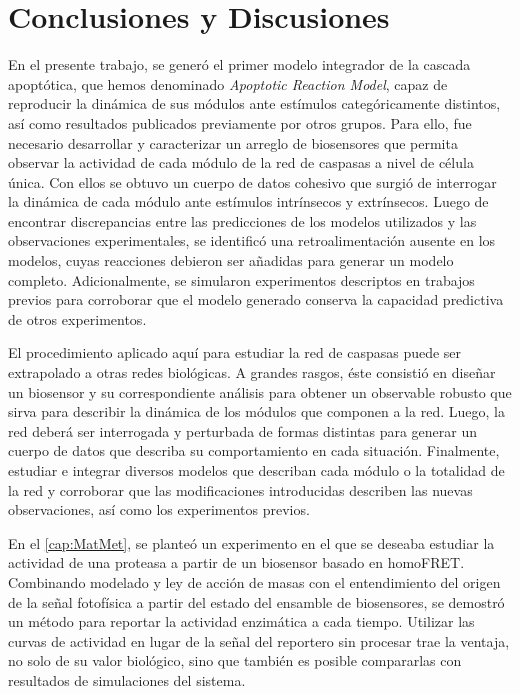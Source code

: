 \chapter{Conclusiones y Discusiones}

En el presente trabajo, se generó el primer modelo integrador de la cascada apoptótica, que hemos denominado \textit{Apoptotic Reaction Model}, capaz de reproducir la dinámica de sus módulos ante estímulos categóricamente distintos, así como resultados publicados previamente por otros grupos. Para ello, fue necesario desarrollar y caracterizar un arreglo de biosensores que permita observar la actividad de cada módulo de la red de caspasas a nivel de célula única. Con ellos se obtuvo un cuerpo de datos cohesivo que surgió de interrogar la dinámica de cada módulo ante estímulos intrínsecos y extrínsecos. Luego de encontrar discrepancias entre las predicciones de los modelos utilizados y las observaciones experimentales, se identificó una retroalimentación ausente en los modelos, cuyas reacciones debieron ser añadidas para generar un modelo completo. Adicionalmente, se simularon experimentos descriptos en trabajos previos para corroborar que el modelo generado conserva la capacidad predictiva de otros experimentos.

El procedimiento aplicado aquí para estudiar la red de caspasas puede ser extrapolado a otras redes biológicas. A grandes rasgos, éste consistió en diseñar un biosensor y su correspondiente análisis para obtener un observable robusto que sirva para describir la dinámica de los módulos que componen a la red. Luego, la red deberá ser interrogada y perturbada de formas distintas para generar un cuerpo de datos que describa su comportamiento en cada situación. Finalmente, estudiar e integrar diversos modelos que describan cada módulo o la totalidad de la red y corroborar que las modificaciones introducidas describen las nuevas observaciones, así como los experimentos previos.

En el \cref{cap:MatMet}, se planteó un experimento en el que se deseaba estudiar la actividad de una proteasa a partir de un biosensor basado en homoFRET. Combinando modelado y ley de acción de masas con el entendimiento del origen de la señal fotofísica a partir del estado del ensamble de biosensores, se demostró un método para reportar la actividad enzimática a cada tiempo.  Utilizar las curvas de actividad en lugar de la señal del reportero sin procesar trae la ventaja, no solo de su valor biológico, sino que también es posible compararlas con resultados de simulaciones del sistema.

